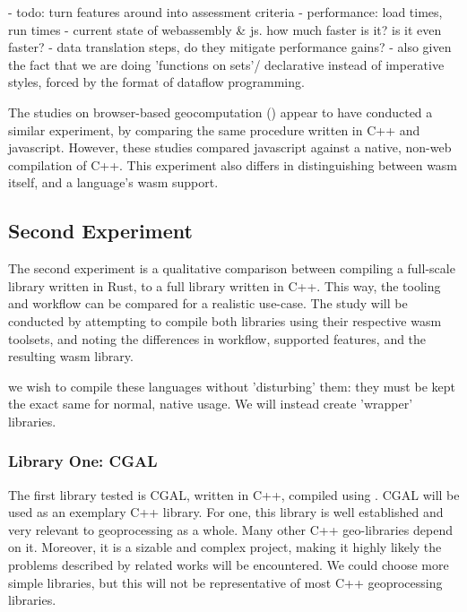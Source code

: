 \begin{note}
  - todo: turn features around into assessment criteria
  - performance: load times, run times
  - current state of webassembly & js. how much faster is it? is it even faster? 
     - data translation steps, do they mitigate performance gains? 
     - also given the fact that we are doing 'functions on sets'/ declarative instead of imperative styles, forced by the format of dataflow programming. 
\end{note}

The studies on browser-based geocomputation () appear to have conducted a similar experiment, by comparing the same procedure written in C++ and javascript. 
However, these studies compared javascript against a native, non-web compilation of C++. 
This experiment also differs in distinguishing between \ac{wasm} itself, and a language's \ac{wasm} support.


\subsection{Second Experiment}
The second experiment is a qualitative comparison between compiling a full-scale library written in Rust, to a full library written in C++. 
This way, the tooling and workflow can be compared for a realistic use-case. 
The study will be conducted by attempting to compile both libraries using their respective \ac{wasm} toolsets, and noting the differences in workflow, supported features, and the resulting wasm library. 

we wish to compile these languages without 'disturbing' them: they must be kept the exact same for normal, native usage. 
We will instead create 'wrapper' libraries. 

\subsubsection*{Library One: CGAL}
The first library tested is CGAL, written in C++, compiled using .
CGAL will be used as an exemplary C++ library. 
For one, this library is well established and very relevant to geoprocessing as a whole. 
Many other C++ geo-libraries depend on it.
Moreover, it is a sizable and complex project, making it highly likely the problems described by related works will be encountered. 
We could choose more simple libraries, but this will not be representative of most C++ geoprocessing libraries. 

